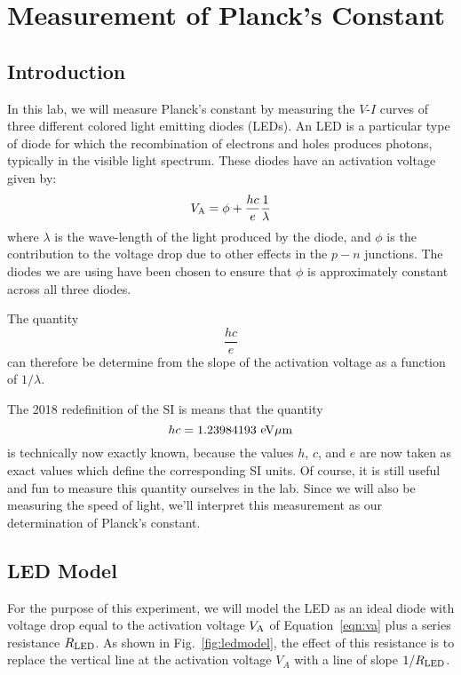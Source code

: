 
\chapter{Measurement of Planck's Constant}

\section{Introduction}

In this lab, we will measure Planck's constant by measuring the
$V$-$I$ curves of three different colored light emitting diodes
(LEDs).  An LED is a particular type of diode for which the
recombination of electrons and holes produces photons, typically in
the visible light spectrum.  These diodes have an activation voltage given by:
\begin{equation} \label{eqn:va}
V_{\rm A} = \phi + \frac{hc}{e}\frac{1}{\lambda}
\end{equation}
where $\lambda$ is the wave-length of the light produced by the diode,
and $\phi$ is the contribution to the voltage drop due to other
effects in the $p-n$ junctions.  The diodes we are using have been
chosen to ensure that $\phi$ is approximately constant across all
three diodes.

The quantity
\begin{displaymath}
\frac{hc}{e}
\end{displaymath}
can therefore be determine from the slope of the activation voltage as a function of $1/\lambda$.

The 2018 redefinition of the SI is means that the quantity
\begin{displaymath}
hc = 1.23984193~\rm eV \mu m
\end{displaymath}
is technically now exactly known, because the values $h$, $c$, and $e$
are now taken as exact values which define the corresponding SI
units. Of course, it is still useful and fun to measure this quantity
ourselves in the lab.  Since we will also be measuring the speed of
light, we'll interpret this measurement as our determination of
Planck's constant.

\section{LED Model}

For the purpose of this experiment, we will model the LED as an ideal
diode with voltage drop equal to the activation voltage $V_{\rm A}$ of
Equation~\ref{eqn:va} plus a series resistance $R_{\rm LED}$.  As
shown in Fig.~\ref{fig:ledmodel}, the effect of this resistance is to
replace the vertical line at the activation voltage $V_A$ with a line
of slope $1/R_{\rm LED}$.

